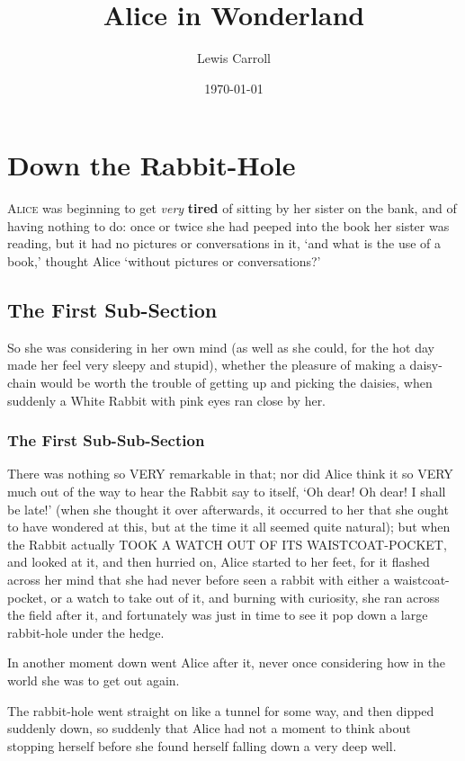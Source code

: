 \documentclass{article}
\title{Alice in Wonderland}
\author{Lewis Carroll}
\date{\today}
\begin{document}
\maketitle
\section{Down the Rabbit-Hole}
\begin{multicols}{2}
\textsc{Alice} was beginning to get \textit{very} \textbf{tired} of sitting by her sister on the
bank, and of having nothing to do: once or twice she had peeped into the
book her sister was reading, but it had no pictures or conversations in
it, `and what is the use of a book,' thought Alice `without pictures or
conversations?'
\subsection{The First Sub-Section}
So she was considering in her own mind (as well as she could, for the
hot day made her feel very sleepy and stupid), whether the pleasure
of making a daisy-chain would be worth the trouble of getting up and
picking the daisies, when suddenly a White Rabbit with pink eyes ran
close by her.
\subsubsection*{The First Sub-Sub-Section}
There was nothing so VERY remarkable in that; nor did Alice think it so
VERY much out of the way to hear the Rabbit say to itself, `Oh dear!
Oh dear! I shall be late!' (when she thought it over afterwards, it
occurred to her that she ought to have wondered at this, but at the time
it all seemed quite natural); but when the Rabbit actually TOOK A WATCH
OUT OF ITS WAISTCOAT-POCKET, and looked at it, and then hurried on,
Alice started to her feet, for it flashed across her mind that she had
never before seen a rabbit with either a waistcoat-pocket, or a watch
to take out of it, and burning with curiosity, she ran across the field
after it, and fortunately was just in time to see it pop down a large
rabbit-hole under the hedge.

In another moment down went Alice after it, never once considering how
in the world she was to get out again.

The rabbit-hole went straight on like a tunnel for some way, and then
dipped suddenly down, so suddenly that Alice had not a moment to think
about stopping herself before she found herself falling down a very deep
well.


\end{multicols}
\end{document}
